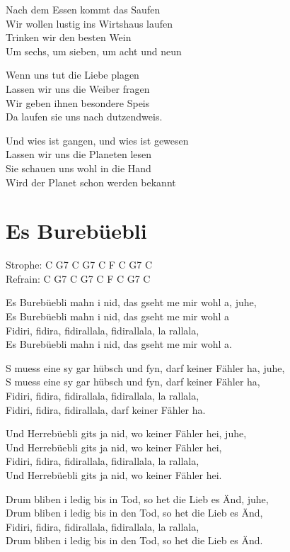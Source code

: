 \documentclass[
  letterpaper,
]{scrbook}
\begin{document}
Nach dem Essen kommt das Saufen\\
Wir wollen lustig ins Wirtshaus laufen\\
Trinken wir den besten Wein\\
Um sechs, um sieben, um acht und neun

Wenn uns tut die Liebe plagen\\
Lassen wir uns die Weiber fragen\\
Wir geben ihnen besondere Speis\\
Da laufen sie uns nach dutzendweis.

Und wies ist gangen, und wies ist gewesen\\
Lassen wir uns die Planeten lesen\\
Sie schauen uns wohl in die Hand\\
Wird der Planet schon werden bekannt

\hypertarget{es-burebuxfcebli}{%
\chapter{Es Burebüebli}\label{es-burebuxfcebli}}

Strophe: C G7 C G7 C F C G7 C\\
Refrain: C G7 C G7 C F C G7 C

Es Burebüebli mahn i nid, das gseht me mir wohl a, juhe,\\
Es Burebüebli mahn i nid, das gseht me mir wohl a\\
Fidiri, fidira, fidirallala, fidirallala, la rallala,\\
Es Burebüebli mahn i nid, das gseht me mir wohl a.

S muess eine sy gar hübsch und fyn, darf keiner Fähler ha, juhe,\\
S muess eine sy gar hübsch und fyn, darf keiner Fähler ha,\\
Fidiri, fidira, fidirallala, fidirallala, la rallala,\\
Fidiri, fidira, fidirallala, darf keiner Fähler ha.

Und Herrebüebli git\textquotesingle s ja nid, wo keiner Fähler hei,
juhe,\\
Und Herrebüebli git\textquotesingle s ja nid, wo keiner Fähler hei,\\
Fidiri, fidira, fidirallala, fidirallala, la rallala,\\
Und Herrebüebli git\textquotesingle s ja nid, wo keiner Fähler hei.

Drum bliben i ledig bis in Tod, so het die Lieb es Änd, juhe,\\
Drum bliben i ledig bis in den Tod, so het die Lieb es Änd,\\
Fidiri, fidira, fidirallala, fidirallala, la rallala,\\
Drum bliben i ledig bis in den Tod, so het die Lieb es Änd.
\end{document}

